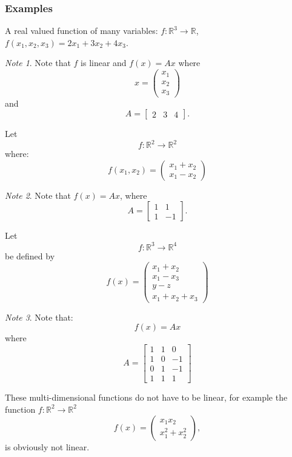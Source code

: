 \documentclass[12pt,a4paper]{article}
\theoremstyle{regla}
\theoremstyle{remark}
\newtheorem{notes}{Note}[section]
\theoremstyle{definition}
\theoremstyle{nonumberbreak}
\begin{document}
\subsubsection{Examples}
\begin{xmpl}
A real valued function of many variables: $f: \mathbb{R}^3\to\mathbb{R}$, $f(x_1,x_2,x_3)=2x_1+3x_2+4x_3$. 
\begin{notes}
Note that $f$ is linear and $f(x)=Ax$ where
$$x=\begin{pmatrix} x_1\\
x_2\\
x_3\end{pmatrix}$$
and
$$A=\begin{bmatrix}2&3&4\end{bmatrix}.$$
\end{notes}
\end{xmpl}
\begin{xmpl}
Let 
$$
f: \mathbb{R}^{2} \rightarrow \mathbb{R}^{2}
$$
where:
$$
f(x_1,x_2) = \left(
\begin{array}{c}
x_1+x_2 \\
x_1-x_2
\end{array} \right)
$$
\begin{notes}
Note that $f(x)=Ax$, where 
$$A=\begin{bmatrix}
1&1\\
1&-1
\end{bmatrix}.$$
\end{notes}
\end{xmpl}
\begin{xmpl}
Let 
$$
f: \mathbb{R}^{3} \rightarrow \mathbb{R}^{4}
$$
be defined by
$$
f(x)
= \left(
\begin{array}{c}
x_1+x_2 \\
x_1-x_3 \\
y-z \\
x_1+x_2+x_3
\end{array} \right)
$$
\begin{notes}
Note that:
$$
f(x) = Ax
$$
where
$$
A =
\begin{bmatrix}
1 & 1 & 0\\
1 & 0 & -1\\
0 & 1 & -1\\
1 & 1 & 1
\end{bmatrix}
$$
\end{notes}
\end{xmpl}
\begin{xmpl}
These multi-dimensional functions do not have to be linear, for example the function $f:\mathbb{R}^2\to\mathbb{R}^2$
$$
f(x) = \left(
\begin{array}{c}
x_1x_2 \\
x_1^{2}+x_2^{2}
\end{array} \right),
$$ 
is obviously not linear.
\end{xmpl}
\end{document}
